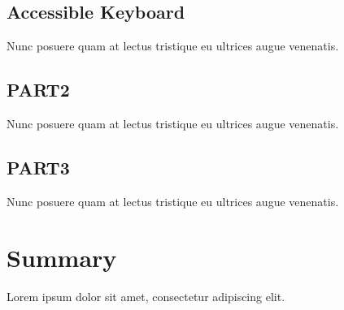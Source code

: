 \subsection{Accessible Keyboard}

Nunc posuere quam at lectus tristique eu ultrices augue venenatis.

\subsection{PART2}

Nunc posuere quam at lectus tristique eu ultrices augue venenatis.

\subsection{PART3}

Nunc posuere quam at lectus tristique eu ultrices augue venenatis.


\section{Summary}

Lorem ipsum dolor sit amet, consectetur adipiscing elit.